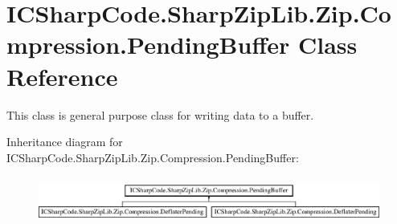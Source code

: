 \hypertarget{class_i_c_sharp_code_1_1_sharp_zip_lib_1_1_zip_1_1_compression_1_1_pending_buffer}{}\section{I\+C\+Sharp\+Code.\+Sharp\+Zip\+Lib.\+Zip.\+Compression.\+Pending\+Buffer Class Reference}
\label{class_i_c_sharp_code_1_1_sharp_zip_lib_1_1_zip_1_1_compression_1_1_pending_buffer}


This class is general purpose class for writing data to a buffer.  


Inheritance diagram for I\+C\+Sharp\+Code.\+Sharp\+Zip\+Lib.\+Zip.\+Compression.\+Pending\+Buffer\+:\begin{figure}[H]
\begin{center}
\leavevmode
\includegraphics[height=1.534247cm]{class_i_c_sharp_code_1_1_sharp_zip_lib_1_1_zip_1_1_compression_1_1_pending_buffer}
\end{center}
\end{figure}
